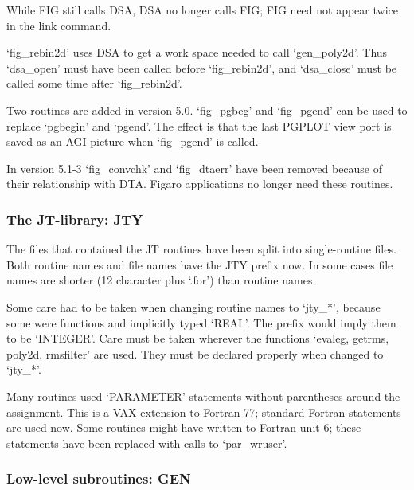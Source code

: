    While FIG still calls DSA, DSA no longer calls FIG; FIG need not
   appear twice in the link command.

   `fig\_rebin2d' uses DSA to get a work space needed to call
   `gen\_poly2d'.  Thus `dsa\_open' must have been called before
   `fig\_rebin2d', and `dsa\_close' must be called some time after
   `fig\_rebin2d'.

   Two routines are added in version 5.0. `fig\_pgbeg' and `fig\_pgend'
   can be used to replace `pgbegin' and `pgend'. The effect is that the
   last PGPLOT view port is saved as an AGI picture when `fig\_pgend' is
   called.

   In version 5.1-3 `fig\_convchk' and `fig\_dtaerr' have been removed
   because of their relationship with DTA. Figaro applications no
   longer need these routines.


\subsubsection{\label{changessub8}The JT-library: JTY}

   The files that contained the JT routines have been split into
   single-routine files. Both routine names and file names have the JTY
   prefix now. In some cases file names are shorter (12 character plus
   `.for') than routine names.

   Some care had to be taken when changing routine names to `jty\_*',
   because some were functions and implicitly typed `REAL'. The prefix
   would imply them to be `INTEGER'. Care must be taken wherever the
   functions `evaleg, getrms, poly2d, rmsfilter' are used. They must be
   declared properly when changed to `jty\_*'.

   Many routines used `PARAMETER' statements without parentheses around the
   assignment.  This is a VAX extension to Fortran 77; standard Fortran
   statements are used now.  Some routines might have written to Fortran
   unit 6; these statements have been replaced with calls to
   `par\_wruser'.


\subsubsection{\label{changessub9}Low-level subroutines: GEN}

